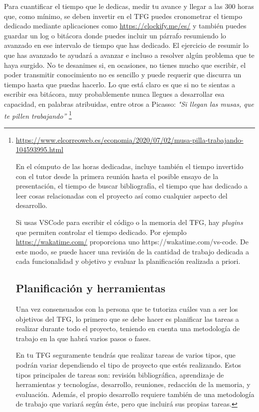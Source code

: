 Para cuantificar el tiempo que le dedicas, medir tu avance y llegar a las 300 horas que, como mínimo, se deben invertir en el TFG puedes cronometrar el tiempo dedicado mediante aplicaciones como \url{https://clockify.me/es/} y también puedes guardar un log o bitácora donde puedes incluir un párrafo resumiendo lo avanzado en ese intervalo de tiempo que has dedicado. El ejercicio de resumir lo que has avanzado te ayudará a avanzar e incluso a resolver algún problema que te haya surgido. No te desanimes si, en ocasiones, no tienes mucho que escribir, el poder transmitir conocimiento no es sencillo y puede requerir que discurra un tiempo hasta que puedas hacerlo. Lo que está claro es que si no te sientas a escribir esa bitácora, muy probablemente nunca llegues a desarrollar esa capacidad, en palabras atribuidas, entre otros a Picasso: {\it "Si llegan las musas, que te pillen trabajando”} \footnote{\url{https://www.elcorreoweb.es/economia/2020/07/02/musa-pilla-trabajando-104593995.html} 

En el cómputo de las horas dedicadas, incluye también el tiempo invertido con el tutor desde la primera reunión hasta el posible ensayo de la presentación, el tiempo de buscar bibliografía, el tiempo que has dedicado a leer cosas relacionadas con el proyecto así como cualquier aspecto del desarrollo.

Si usas VSCode para escribir el código o la memoria del TFG, hay {\it plugins} que permiten controlar el tiempo dedicado. Por ejemplo \url{https://wakatime.com/} proporciona uno {https://wakatime.com/vs-code}. De este modo, se puede hacer una revisión de la cantidad de trabajo dedicada a cada funcionalidad y objetivo y evaluar la planificación realizada a priori.




\subsection{Planificación y herramientas} %
Una vez consensuados con la persona que te tutoriza cuáles van a ser los objetivos del TFG, lo primero que se debe hacer es planificar las tareas a realizar durante todo el proyecto, teniendo en cuenta una metodología de trabajo en la que habrá varios pasos o fases.

En tu TFG seguramente tendrás que realizar tareas de varios tipos, que podrán variar dependiendo el tipo de proyecto que estés realizando. Estos tipos principales de tareas son: revisión bibliográfica, aprendizaje de herramientas y tecnologías, desarrollo, reuniones, redacción de la memoria, y evaluación. Además, el propio desarrollo requiere también de una metodología de trabajo que variará según éste, pero que incluirá sus propias tareas.

}
